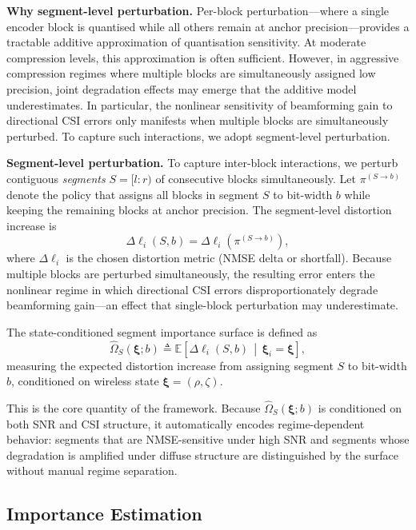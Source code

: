 \documentclass[conference]{IEEEtran}
\newcommand{\E}{\mathbb{E}}
\newcommand{\Given}{\,\middle|\,}
\begin{document}
\textbf{Why segment-level perturbation.}
Per-block perturbation---where a single encoder block is quantised while all others remain at anchor precision---provides a tractable additive approximation of quantisation sensitivity. At moderate compression levels, this approximation is often sufficient. However, in aggressive compression regimes where multiple blocks are simultaneously assigned low precision, joint degradation effects may emerge that the additive model underestimates. In particular, the nonlinear sensitivity of beamforming gain to directional CSI errors only manifests when multiple blocks are simultaneously perturbed. To capture such interactions, we adopt segment-level perturbation.

\textbf{Segment-level perturbation.}
To capture inter-block interactions, we perturb contiguous \emph{segments} $S=[l{:}r)$ of consecutive blocks simultaneously.
Let $\pi^{(S\to b)}$ denote the policy that assigns all blocks in segment $S$ to bit-width $b$ while keeping the remaining blocks at anchor precision.
The segment-level distortion increase is
\begin{equation}
\Delta\ell_i(S,b) = \Delta\ell_i(\pi^{(S\to b)}),
\label{eq:segment_delta}
\end{equation}
where $\Delta\ell_i$ is the chosen distortion metric (NMSE delta or shortfall).
Because multiple blocks are perturbed simultaneously, the resulting error enters the nonlinear regime in which directional CSI errors disproportionately degrade beamforming gain---an effect that single-block perturbation may underestimate.

The state-conditioned segment importance surface is defined as
\begin{equation}
\widehat{\Omega}_S(\boldsymbol{\xi}; b) \triangleq \E\!\left[
\Delta\ell_i(S,b) \Given \boldsymbol{\xi}_i = \boldsymbol{\xi}
\right],
\label{eq:segment_omega}
\end{equation}
measuring the expected distortion increase from assigning segment $S$ to bit-width $b$, conditioned on wireless state $\boldsymbol{\xi}=(\rho,\zeta)$.

This is the core quantity of the framework. Because $\widehat{\Omega}_S(\boldsymbol{\xi}; b)$ is conditioned on both SNR and CSI structure, it automatically encodes regime-dependent behavior: segments that are NMSE-sensitive under high SNR and segments whose degradation is amplified under diffuse structure are distinguished by the surface without manual regime separation.

\subsection{Importance Estimation}
\label{subsec:estimation}
\end{document}
